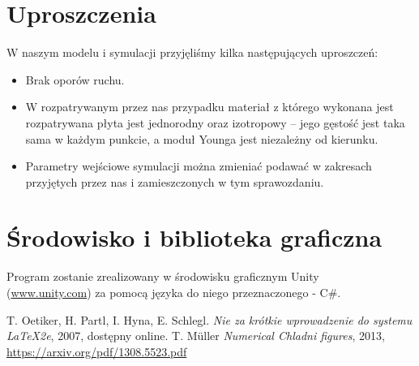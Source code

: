 \documentclass{classrep}
\begin{document}
\section{Uproszczenia}
W naszym modelu i symulacji przyjęliśmy kilka następujących uproszczeń:
\begin{itemize}
	\item Brak oporów ruchu.
	\item W rozpatrywanym przez nas przypadku materiał z którego wykonana jest rozpatrywana płyta jest jednorodny oraz izotropowy -- jego gęstość jest taka sama w każdym punkcie, a moduł Younga jest niezależny od kierunku.
	\item Parametry wejściowe symulacji można zmieniać podawać w zakresach przyjętych przez nas i zamieszczonych w tym sprawozdaniu.
\end{itemize}

\section{Środowisko i biblioteka graficzna}
Program zostanie zrealizowany w środowisku graficznym Unity\\ (\url{www.unity.com}) za pomocą języka do niego przeznaczonego - C\#.

\begin{thebibliography}{0}
   T. Oetiker, H. Partl, I. Hyna, E. Schlegl.
    \textsl{Nie za krótkie wprowadzenie do systemu \LaTeX2e}, 2007, dostępny
    online.
   T. Müller
    \textsl{Numerical Chladni figures}, 2013, \url{https://arxiv.org/pdf/1308.5523.pdf}
\end{thebibliography}
\end{document}
